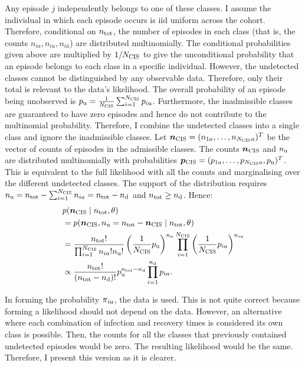 \documentclass[thesis.tex]{subfiles}
\begin{document}
Any episode $j$ independently belongs to one of these classes.
I assume the individual in which each episode occurs is iid uniform across the cohort.
Therefore, conditional on $n_\text{tot}$, the number of episodes in each class (that is, the counts $n_{ia}, n_{iu}, n_{i\bar{a}}$) are distributed multinomially.
The conditional probabilities given above are multiplied by $1/N_\text{CIS}$ to give the unconditional probability that an episode belongs to each class in a specific individual.
However, the undetected classes cannot be distinguished by any observable data.
Therefore, only their total is relevant to the data's likelihood.
The overall probability of an episode being unobserved is $p_\text{u} = \frac{1}{N_\text{CIS}} \sum_{i=1}^{N_\text{CIS}} p_{iu}$.
Furthermore, the inadmissible classes are guaranteed to have zero episodes and hence do not contribute to the multinomial probability.
Therefore, I combine the undetected classes into a single class and ignore the inadmissible classes.
Let $\bm{n_\text{CIS}} = (n_{1a}, \dots, n_{N_\text{CIS} a})^T$ be the vector of counts of episodes in the admissible classes.
The counts $\bm{n_\text{CIS}}$ and $n_\text{u}$ are distributed multinomially with probabilities $\bm{p_\text{CIS}} = (p_{1a}, \dots, p_{N_\text{CIS} a}, p_\text{u})^T$.
This is equivalent to the full likelihood with all the counts and marginalising over the different undetected classes.
The support of the distribution requires $n_\text{u} = n_\text{tot} - \sum_{i=1}^{N_\text{CIS}} n_{ia} = n_\text{tot} - n_\text{d}$ and $n_\text{tot} \geq n_\text{d}$.
Hence:
\begin{align}
&p(\bm{n_\text{CIS}} \mid n_\text{tot}, \theta) \\
&= p(\bm{n_\text{CIS}}, n_\text{u} = n_\text{tot} - \bm{n_\text{CIS}} \mid n_\text{tot}, \theta) \\
&= \frac{n_\text{tot}!}{\prod_{i=1}^{N_\text{CIS}} n_{ia}! n_\text{u}!}  \left(\frac{1}{N_\text{CIS}}p_\text{u}\right)^{n_\text{u}}\prod_{i=1}^{N_\text{CIS}} \left(\frac{1}{N_\text{CIS}}p_{ia}\right)^{n_{ia}} \\
&\propto \frac{n_\text{tot}!}{(n_\text{tot} - n_\text{d})!} p_\text{u}^{n_\text{tot} - n_\text{d}} \prod_{i=1}^{n_\text{d}} p_{ia} \label{perf-test:eq:augmented-likelihood}.
\end{align}

In forming the probability $\operatorname{\pi}_{ia}$, the data is used.
This is not quite correct because forming a likelihood should not depend on the data.
However, an alternative where each combination of infection and recovery times is considered its own class is possible.
Then, the counts for all the classes that previously contained undetected episodes would be zero.
The resulting likelihood would be the same.
Therefore, I present this version as it is clearer.
\end{document}
